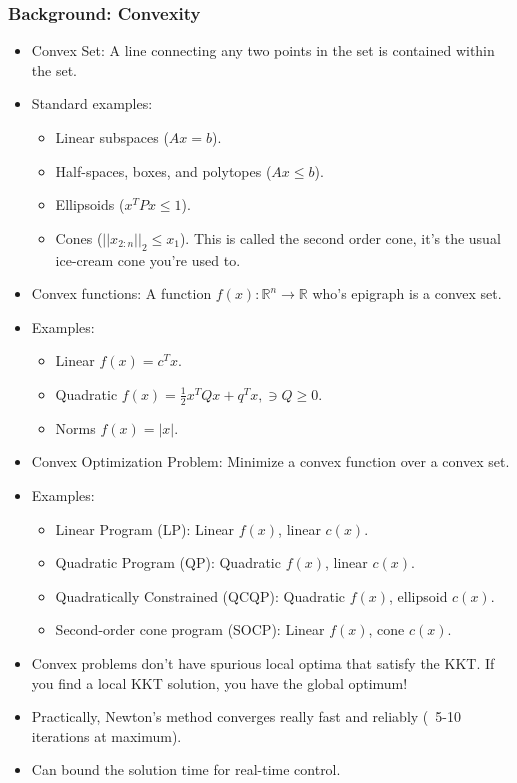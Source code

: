 \subsubsection{Background: Convexity}
\begin{itemize}
    \item Convex Set: A line connecting any two points in the set is contained within the set.
    \item Standard examples:
    \begin{itemize}
        \item Linear subspaces ($Ax=b$).
        \item Half-spaces, boxes, and polytopes ($Ax\leq b$).
        \item Ellipsoids ($x^T P x \leq 1$).
        \item Cones ($||x_{2:n}||_2 \leq x_1$). This is called the second order cone, it's the usual ice-cream cone you're used to.
    \end{itemize}
    \item Convex functions: A function $f(x): \mathbb{R}^n \longrightarrow \mathbb{R}$ who's epigraph is a convex set.
    \item Examples:
    \begin{itemize}
        \item Linear $f(x) = c^T x$.
        \item Quadratic $f(x) = \frac{1}{2} x^T Q x + q^T x, \ni Q \geq 0$.
        \item Norms $f(x) = |x|$.
    \end{itemize}
    \item Convex Optimization Problem: Minimize a convex function over a convex set.
    \item Examples:
    \begin{itemize}
        \item Linear Program (LP): Linear $f(x)$, linear $c(x)$.
        \item Quadratic Program (QP): Quadratic $f(x)$, linear $c(x)$.
        \item Quadratically Constrained (QCQP): Quadratic $f(x)$, ellipsoid $c(x)$.
        \item Second-order cone program (SOCP): Linear $f(x)$, cone $c(x)$.
    \end{itemize}
    \item Convex problems don't have spurious local optima that satisfy the KKT. If you find a local KKT solution, you have the global optimum!
    \item Practically, Newton's method converges really fast and reliably (~5-10 iterations at maximum).
    \item Can bound the solution time for real-time control.
\end{itemize}
